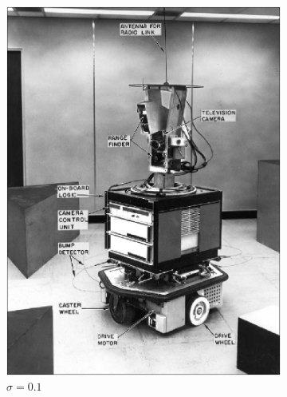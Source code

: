 \documentclass[lettersize,journal]{IEEEtran}
\begin{document}
\begin{figure}[h]
    \centering 
    \begin{subfigure}[h]{0.115\textwidth}
        \centering 
        \includegraphics[width=\linewidth]{gaussian_map_5x5_sigma_0.1}
        \caption{$\sigma=0.1$}  
    \end{subfigure}
    \begin{subfigure}[h]{0.115\textwidth}
        \centering 

\end{subfigure}
\end{figure}
\end{document}
